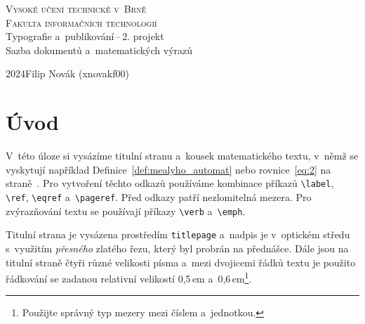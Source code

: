 \documentclass[twocolumn, a4paper, 11pt]{article}
\theoremstyle{plain}
\begin{document}
\begin{titlepage}
    \begin{center}
        \textsc{\Huge{Vysoké učení technické v~Brně\\[0.5em]}
        \huge{Fakulta informačních technologií}}\\        
        {\LARGE{Typografie a~publikování\,--\,2. projekt\\[0.6em]
        Sazba dokumentů a~matematických výrazů}}\\
    \end{center}
    \Large{2024\hfill Filip Novák (xnovakf00)}
\end{titlepage}

\section*{Úvod}
V~této úloze si vysázíme titulní stranu a~kousek matematického
textu, v~němž se vyskytují například Definice~\ref{def:mealyho_automat} nebo rovnice~\eqref{eq:2} na straně~\pageref{pg:one}. Pro vytvoření
těchto odkazů používáme kombinace příkazů \verb|\label|,
\verb|\ref|, \verb|\eqref| a~\verb|\pageref|. Před odkazy patří nezlomitelná
mezera. Pro zvýrazňování textu se používají
příkazy \verb|\verb| a~\verb|\emph|.

Titulní strana je vysázena prostředím \verb|titlepage| a~nadpis je v~optickém středu s~využitím \emph{přesného} zlatého
řezu, který byl probrán na přednášce. Dále jsou
na titulní straně čtyři různé velikosti písma a~mezi
dvojicemi řádků textu je použito řádkování se zadanou
relativní velikostí 0{,}5\,em a~0{,}6\,em\footnote{Použijte správný typ mezery mezi číslem a~jednotkou.}.
\end{document}
